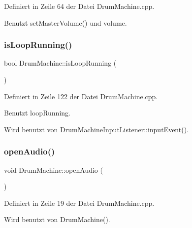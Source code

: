Definiert in Zeile 64 der Datei Drum\+Machine.\+cpp.



Benutzt set\+Master\+Volume() und volume.

\mbox{\label{class_drum_machine_aaa0c2e00a5009b239aac709c37602c7d}} 
\subsubsection{\texorpdfstring{is\+Loop\+Running()}{isLoopRunning()}}
{\footnotesize\ttfamily bool Drum\+Machine\+::is\+Loop\+Running (\begin{DoxyParamCaption}{ }\end{DoxyParamCaption})}



Definiert in Zeile 122 der Datei Drum\+Machine.\+cpp.



Benutzt loop\+Running.



Wird benutzt von Drum\+Machine\+Input\+Listener\+::input\+Event().

\mbox{\label{class_drum_machine_afd65a07ff84b6c7854ddd9ee3a529382}} 
\subsubsection{\texorpdfstring{open\+Audio()}{openAudio()}}
{\footnotesize\ttfamily void Drum\+Machine\+::open\+Audio (\begin{DoxyParamCaption}{ }\end{DoxyParamCaption})\hspace{0.3cm}{\ttfamily [private]}}



Definiert in Zeile 19 der Datei Drum\+Machine.\+cpp.



Wird benutzt von Drum\+Machine().

\mbox{\label{class_drum_machine_a28c17f251dc26e48b518e4863c33d6e8}} 
